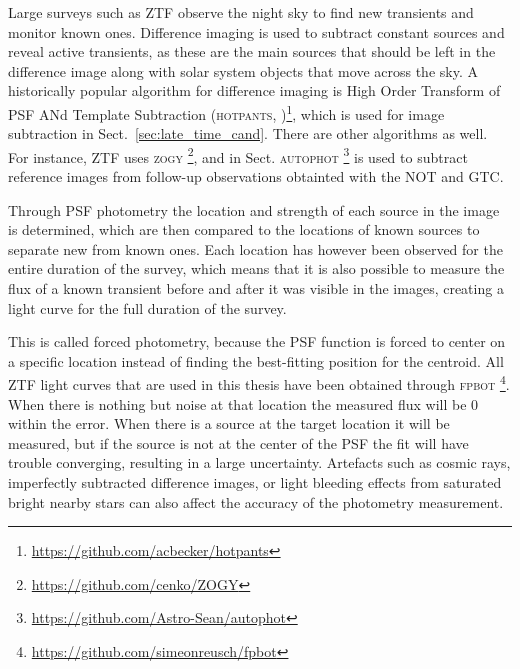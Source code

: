 \documentclass[a4paper,oneside,12pt, class=Latex/Classes/PhDthesisPSnPDF, crop=false]{standalone}
\begin{document}

Large surveys such as ZTF observe the night sky to find new transients and monitor known ones. Difference imaging is used to subtract constant sources and reveal active transients, as these are the main sources that should be left in the difference image along with solar system objects that move across the sky. A historically popular algorithm for difference imaging is High Order Transform of PSF ANd Template Subtraction (\textsc{hotpants}, \citealt{HOTPANTS})\footnote{\url{https://github.com/acbecker/hotpants}}, which is used for image subtraction in Sect.~\ref{sec:late_time_cand}. There are other algorithms as well. For instance, ZTF uses \textsc{zogy} \citep{ZOGY}\footnote{\url{https://github.com/cenko/ZOGY}}, and in \color{red}Sect. \color{black} \textsc{autophot} \citep{Autophot}\footnote{\url{https://github.com/Astro-Sean/autophot}} is used to subtract reference images from follow-up observations obtainted with the NOT and GTC.

Through PSF photometry the location and strength of each source in the image is determined, which are then compared to the locations of known sources to separate new from known ones. Each location has however been observed for the entire duration of the survey, which means that it is also possible to measure the flux of a known transient before and after it was visible in the images, creating a light curve for the full duration of the survey.

This is called forced photometry, because the PSF function is forced to center on a specific location instead of finding the best-fitting position for the centroid. All ZTF light curves that are used in this thesis have been obtained through \textsc{fpbot} \citep{fpbot}\footnote{\url{https://github.com/simeonreusch/fpbot}}. When there is nothing but noise at that location the measured flux will be 0 within the error. When there is a source at the target location it will be measured, but if the source is not at the center of the PSF the fit will have trouble converging, resulting in a large uncertainty. Artefacts such as cosmic rays, imperfectly subtracted difference images, or light bleeding effects from saturated bright nearby stars can also affect the accuracy of the photometry measurement.

\end{document}
